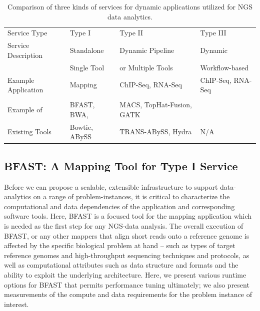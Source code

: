 \documentclass{cpeauth}
\begin{document}
\begin{table}[!h]
\begin{center}
 \caption{Comparison of three kinds of services for dynamic applications utilized for NGS data analytics. %
 }
 \begin{tabular}{| l | l | l | l |} \hline \rowcolor[rgb]{0.8,0.8,0.8}
   Service Type &
   Type I & Type II & Type III \\ 

   Service Description & Standalone  & Dynamic Pipeline & Dynamic \\
               & Single Tool & or Multiple Tools & Workflow-based \\\hline
 Example Application & Mapping & ChIP-Seq, RNA-Seq & ChIP-Seq, RNA-Seq \\ 
  & & & \\ \hline 

  Example of & BFAST, BWA, & MACS, TopHat-Fusion, GATK& 
   \\
   Existing Tools &  Bowtie, ABySS  & TRANS-ABySS, Hydra & N/A \\
   \hline
\end{tabular}
\label{table:three-type-service}
\end{center}
\end{table}


\subsection{BFAST: A Mapping Tool for Type I Service}

Before we can propose a scalable, extensible infrastructure to support
data-analytics on a range of problem-instances, it is critical to
characterize the computational and data dependencies of the application and corresponding software tools.
Here, BFAST is a focused tool for the mapping application which is needed as the first step for any NGS-data analysis.  The overall execution of BFAST, or any other mappers that align short reads onto a reference genome is
affected by the specific biological problem at hand -- such as types
of target reference genomes and high-throughput sequencing techniques
and protocols, as well as computational attributes such as data
structure and formats and the ability to exploit the underlying
architecture.  Here, we present various runtime options for BFAST that permits performance tuning ultimately; we also present measurements of the compute and data requirements for the problem instance of interest.
\end{document}
